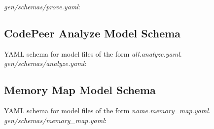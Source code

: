 \begin{appendices}
\textit{gen/schemas/prove.yaml}:

\subsection{CodePeer Analyze Model Schema}
YAML schema for model files of the form \textit{all.analyze.yaml}. \\

\textit{gen/schemas/analyze.yaml}:

\subsection{Memory Map Model Schema}
YAML schema for model files of the form \textit{name.memory\_map.yaml}. \\

\textit{gen/schemas/memory\_map.yaml}:

\end{appendices}


